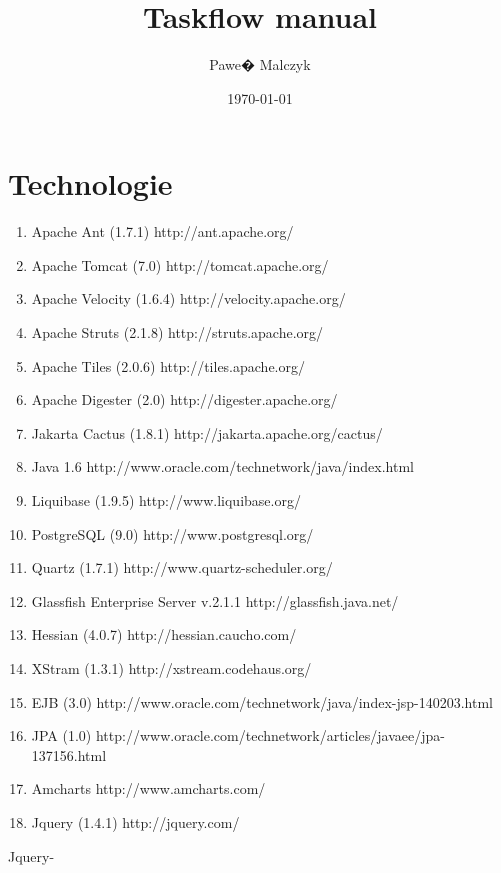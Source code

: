 \documentclass{article}
\title{Taskflow manual}
\author{Pawe� Malczyk}
\date{\today}
\begin{document}
\maketitle
\newpage

\tableofcontents
\newpage

\section{Technologie}

{\small
\begin{enumerate}
  \item Apache Ant (1.7.1) http://ant.apache.org/
  \item Apache Tomcat (7.0) http://tomcat.apache.org/
  \item Apache Velocity (1.6.4) http://velocity.apache.org/
  \item Apache Struts (2.1.8) http://struts.apache.org/
  \item Apache Tiles (2.0.6) http://tiles.apache.org/
  \item Apache Digester (2.0) http://digester.apache.org/
  \item Jakarta Cactus (1.8.1) http://jakarta.apache.org/cactus/
  \item Java 1.6 http://www.oracle.com/technetwork/java/index.html
  \item Liquibase (1.9.5) http://www.liquibase.org/
  \item PostgreSQL (9.0) http://www.postgresql.org/
  \item Quartz (1.7.1) http://www.quartz-scheduler.org/
  \item Glassfish Enterprise Server v.2.1.1 http://glassfish.java.net/
  \item Hessian (4.0.7) http://hessian.caucho.com/
  \item XStram (1.3.1) http://xstream.codehaus.org/
  \item EJB (3.0) http://www.oracle.com/technetwork/java/index-jsp-140203.html
  \item JPA (1.0) http://www.oracle.com/technetwork/articles/javaee/jpa-137156.html
  \item Amcharts http://www.amcharts.com/
  \item Jquery (1.4.1) http://jquery.com/
\end{enumerate}
}
\newpage
\newline 
 \newline
\newline
\newline
\newline
Jquery-\newline
\end{document}
